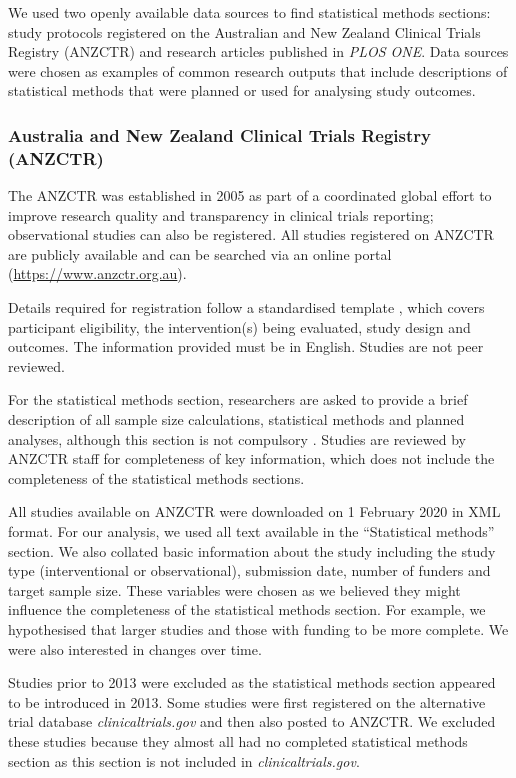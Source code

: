 \documentclass[12pt]{article}
\begin{document}
We used two openly available data sources to find statistical methods
sections: study
protocols registered on the Australian and New Zealand Clinical Trials
Registry (ANZCTR) and research articles published in \emph{PLOS ONE}. Data sources were chosen as examples of common
research outputs that include descriptions of statistical methods that
were planned or used for analysing study outcomes.

\subsubsection{Australia and New Zealand Clinical Trials Registry (ANZCTR)}
\label{sec:methodsANZCTR}

The ANZCTR was established in 2005 as part of a coordinated global
effort to improve research quality and transparency in clinical trials
reporting; observational studies can also be registered. All studies
registered on ANZCTR are publicly available and can be searched via an
online portal (\url{https://www.anzctr.org.au}).

Details required for registration follow a standardised template
\citep{ANZCTR}, which covers participant eligibility, the
intervention(s) being evaluated, study design and outcomes. The
information provided must be in English. Studies are not peer reviewed.

For the statistical methods section, researchers are asked to provide a
brief description of all sample size calculations, statistical
methods and planned analyses, although this section is not compulsory
\citep{ANZCTR}. Studies are reviewed by ANZCTR staff for completeness of
key information, which does not include the completeness of the
statistical methods sections.

All studies available on ANZCTR were downloaded on 1 February 2020 in
XML format. For our analysis, we used all text available in the ``Statistical
methods'' section. We also collated basic information about the study
including the study type (interventional or observational), submission
date, number of funders and target sample size. These variables were
chosen as we believed they might influence the completeness of the
statistical methods section. For example, we hypothesised that larger studies and
those with funding to be more complete. We were also interested in
changes over time.

Studies prior to 2013 were excluded as the statistical methods section
appeared to be introduced in 2013. Some studies were first registered on
the alternative trial database \emph{clinicaltrials.gov} and then also
posted to ANZCTR. We excluded these studies because they almost all had
no completed statistical methods section as this section is not included
in \emph{clinicaltrials.gov}.
\end{document}
